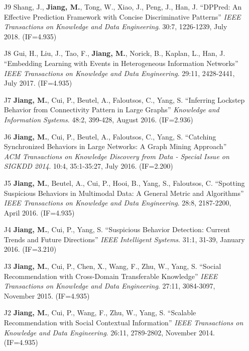 \documentclass[10pt]{article}
\newenvironment{myindentpar}[1]%
{\begin{list}{}%
         {\setlength{\leftmargin}{#1}}%
         \item[]%
}
{\end{list}}
\newcounter{list}
\begin{document}
\begin{myindentpar}{0.00cm}
\begin{enumerate}[leftmargin=.5cm]
\item[J9] Shang, J., \textbf{Jiang, M.}, Tong, W., Xiao, J., Peng, J., Han, J. ``DPPred: An Effective Prediction Framework with Concise Discriminative Patterns'' \textit{IEEE Transactions on Knowledge and Data Engineering}. 30:7, 1226-1239, July 2018. (IF=4.935)

\item[J8] Gui, H., Liu, J., Tao, F., \textbf{Jiang, M.}, Norick, B., Kaplan, L., Han, J. ``Embedding Learning with Events in Heterogeneous Information Networks'' \textit{IEEE Transactions on Knowledge and Data Engineering}. 29:11, 2428-2441, July 2017. (IF=4.935)

\item[J7] \textbf{Jiang, M.}, Cui, P., Beutel, A., Faloutsos, C., Yang, S. ``Inferring Lockstep Behavior from Connectivity Pattern in Large Graphs'' \textit{Knowledge and Information Systems}. 48:2, 399-428, August 2016. (IF=2.936)

\item[J6] \textbf{Jiang, M.}, Cui, P., Beutel, A., Faloutsos, C., Yang, S. ``Catching Synchronized Behaviors in Large Networks: A Graph Mining Approach'' \textit{ACM Transactions on Knowledge Discovery from Data - Special Issue on SIGKDD 2014}. 10:4, 35:1-35:27, July 2016. (IF=2.200)

\item[J5] \textbf{Jiang, M.}, Beutel, A., Cui, P., Hooi, B., Yang, S., Faloutsos, C. ``Spotting Suspicious Behaviors in Multimodal Data: A General Metric and Algorithms'' \textit{IEEE Transactions on Knowledge and Data Engineering}. 28:8, 2187-2200, April 2016. (IF=4.935)

\item[J4] \textbf{Jiang, M.}, Cui, P., Yang, S. ``Suspicious Behavior Detection: Current Trends and Future Directions'' \textit{IEEE Intelligent Systems}. 31:1, 31-39, January 2016. (IF=3.210)

\item[J3] \textbf{Jiang, M.}, Cui, P., Chen, X., Wang, F., Zhu, W., Yang, S. ``Social Recommendation with Cross-Domain Transferable Knowledge'' \textit{IEEE Transactions on Knowledge and Data Engineering}. 27:11, 3084-3097, November 2015. (IF=4.935)

\item[J2] \textbf{Jiang, M.}, Cui, P., Wang, F., Zhu, W., Yang, S. ``Scalable Recommendation with Social Contextual Information'' \textit{IEEE Transactions on Knowledge and Data Engineering}. 26:11, 2789-2802, November 2014. (IF=4.935)


\end{enumerate}
\end{myindentpar}
\end{document}
